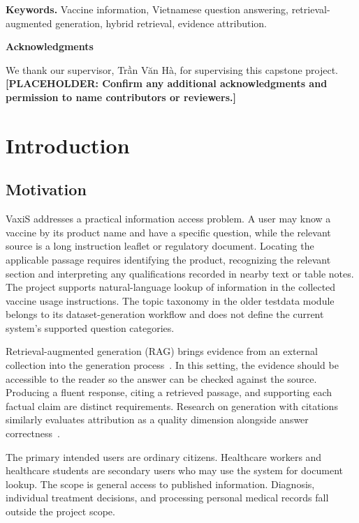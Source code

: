 \documentclass[oneside]{sn-jnl}
\newcommand{\pending}[1]{\textbf{\textcolor{red!65!black}{[PLACEHOLDER: #1]}}}
\begin{document}
\noindent\textbf{Keywords.} Vaccine information, Vietnamese question answering, retrieval-augmented generation, hybrid retrieval, evidence attribution.

\newpage
\begin{center}\Large\bfseries Acknowledgments\end{center}
We thank our supervisor, Trần Văn Hà, for supervising this capstone project.
\pending{Confirm any additional acknowledgments and permission to name contributors or reviewers.}

\newpage
\tableofcontents
\newpage
\listoffigures
\newpage

\section{Introduction}

\subsection{Motivation}
VaxiS addresses a practical information access problem. A user may know a vaccine by its product name and have a specific question, while the relevant source is a long instruction leaflet or regulatory document. Locating the applicable passage requires identifying the product, recognizing the relevant section and interpreting any qualifications recorded in nearby text or table notes. The project supports natural-language lookup of information in the collected vaccine usage instructions. The topic taxonomy in the older testdata module belongs to its dataset-generation workflow and does not define the current system's supported question categories.

Retrieval-augmented generation (RAG) brings evidence from an external collection into the generation process~\cite{lewis2020rag}. In this setting, the evidence should be accessible to the reader so the answer can be checked against the source. Producing a fluent response, citing a retrieved passage, and supporting each factual claim are distinct requirements. Research on generation with citations similarly evaluates attribution as a quality dimension alongside answer correctness~\cite{gao2023citations}.

The primary intended users are ordinary citizens. Healthcare workers and healthcare students are secondary users who may use the system for document lookup. The scope is general access to published information. Diagnosis, individual treatment decisions, and processing personal medical records fall outside the project scope.
\end{document}
